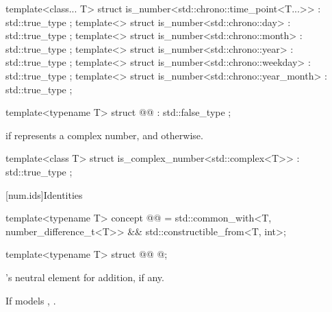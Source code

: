 %
%
%
%
%
%
\begin{itemdecl}
template<class... T>
struct is_number<std::chrono::time_point<T...>> : std::true_type {};
template<>
struct is_number<std::chrono::day> : std::true_type {};
template<>
struct is_number<std::chrono::month> : std::true_type {};
template<>
struct is_number<std::chrono::year> : std::true_type {};
template<>
struct is_number<std::chrono::weekday> : std::true_type {};
template<>
struct is_number<std::chrono::year_month> : std::true_type {};
\end{itemdecl}

\begin{itemdecl}
template<typename T>
struct @@ : std::false_type {};
\end{itemdecl}

\begin{itemdescr}
\pnum
\cvalue
{} if  represents a complex number, and
 otherwise.
\end{itemdescr}

%
\begin{itemdecl}
template<class T>
struct is_complex_number<std::complex<T>> : std::true_type {};
\end{itemdecl}

[num.ids]{Identities}

\begin{codeblock}
template<typename T>
concept @@ =
  std::common_with<T, number_difference_t<T>> && std::constructible_from<T, int>;
\end{codeblock}

%
\begin{itemdecl}
template<typename T>
struct @@ { @\seebelow@ };
\end{itemdecl}

\begin{itemdescr}
\pnum
\cvalue
{}'s neutral element for addition, if any.

\pnum
\dvalue
If  models , .
\end{itemdescr}

